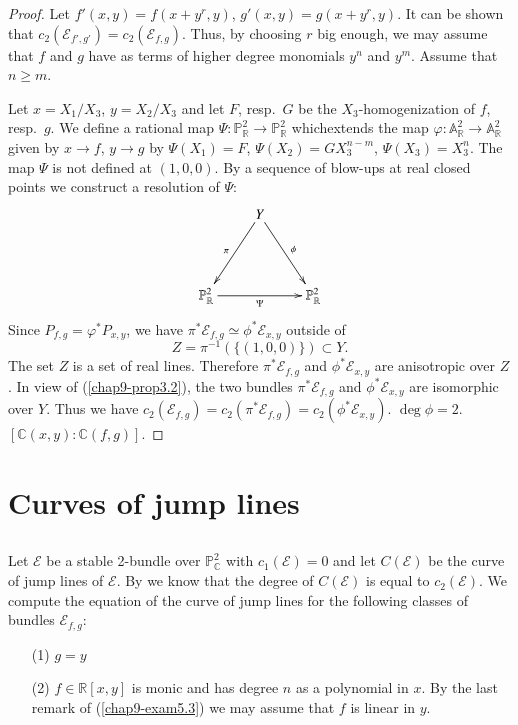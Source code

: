 \begin{proof}
Let $f'(x,y)=f(x+y^{r},y)$, $g'(x,y)=g(x+y^{r},y)$. It can be shown
that $c_{2}(\mathscr{E}_{f',g'})=c_{2}(\mathscr{E}_{f,g})$. Thus, by
choosing $r$ big enough, we may assume that $f$ and $g$ have as terms
of higher degree monomials $y^{n}$ and $y^{m}$. Assume that $n\geq m$.

Let $x=X_{1}/X_{3}$, $y=X_{2}/X_{3}$ and let $F$, resp.~$G$ be the
$X_{3}$-homogeni\-zation of $f$, resp.~$g$. We define a rational map
$\Psi:\mathbb{P}^{2}_{\mathbb{R}}\to \mathbb{P}^{2}_{\mathbb{R}}$
which\pageoriginale extends the map $\varphi:\mathbb{A}^{2}_{\mathbb{R}}\to \mathbb{A}^{2}_{\mathbb{R}}$ given by $x\to f$, $y\to g$ by $\Psi(X_{1})=F$, $\Psi(X_{2})=GX^{n-m}_{3}$, $\Psi(X_{3})=X^{n}_{3}$. The map $\Psi$ is not defined at $(1,0,0)$. By a sequence of blow-ups at real closed points we construct a resolution of $\Psi$:
\[
\xymatrix@R=1.5cm{
 & Y\ar[dl]_{\pi}\ar[dr]^{\phi} &\\
\mathbb{P}^{2}_{\mathbb{R}}\ar[rr]_-{\Psi} && \mathbb{P}^{2}_{\mathbb{R}}
}
\]
Since $P_{f,g}=\varphi^{*}P_{x,y}$, we have $\pi^{*}\mathscr{E}_{f,g}\simeq \phi^{*}\mathscr{E}_{x,y}$ outside of 
$$
Z=\pi^{-1}(\{(1,0,0)\})\subset Y.
$$ 
The set $Z$ is a set of real lines. Therefore $\pi^{*}\mathscr{E}_{f,g}$ and $\phi^{*}\mathscr{E}_{x,y}$ are anisotropic over $Z$. In view of (\ref{chap9-prop3.2}), the two bundles $\pi^{*}\mathscr{E}_{f,g}$ and $\phi^{*}\mathscr{E}_{x,y}$ are isomorphic over $Y$. Thus we have $c_{2}(\mathscr{E}_{f,g})=c_{2}(\pi^{*}\mathscr{E}_{f,g})=c_{2}(\phi^{*}\mathscr{E}_{x,y})$. $\deg\phi=2$. $[\mathbb{C}(x,y):\mathbb{C}(f,g)]$. 
\end{proof}

\section{Curves of jump lines}\label{chap9-sec8}

\subsection{}\label{chap9-sec8.1}
Let $\mathscr{E}$ be a stable 2-bundle over
$\mathbb{P}^{2}_{\mathbb{C}}$ with $c_{1}(\mathscr{E})=0$ and let
$C(\mathscr{E})$ be the curve of jump lines of
$\mathscr{E}$. By \cite{chap9-key1} we know that the degree of
$C(\mathscr{E})$ is equal to $c_{2}(\mathscr{E})$. We compute the
equation of the curve of jump lines for the following classes of
bundles $\mathscr{E}_{f,g}$: 
\begin{itemize}
\item[(1)] $g=y$

\item[(2)] $f\in \mathbb{R}[x,y]$ is monic and has degree $n$ as a
polynomial in $x$. By the last remark of (\ref{chap9-exam5.3}) we may
assume that $f$ is linear in $y$.
\end{itemize}

